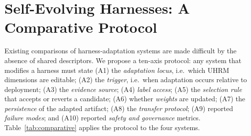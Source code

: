 \documentclass[conference]{IEEEtran}
\begin{document}
\section{Self-Evolving Harnesses: A Comparative Protocol}
\label{sec:comparative}

Existing comparisons of harness-adaptation systems are made difficult by the absence of shared descriptors. We propose a ten-axis protocol: any system that modifies a harness must state (A1) the \emph{adaptation locus}, i.e.\ which UHRM dimensions are editable; (A2) the \emph{trigger}, i.e.\ when adaptation occurs relative to deployment; (A3) the \emph{evidence source}; (A4) \emph{label access}; (A5) the \emph{selection rule} that accepts or reverts a candidate; (A6) whether \emph{weights} are updated; (A7) the \emph{persistence} of the adapted artifact; (A8) the \emph{transfer protocol}; (A9) reported \emph{failure modes}; and (A10) reported \emph{safety and governance} metrics. Table~\ref{tab:comparative} applies the protocol to the four systems.
\end{document}
